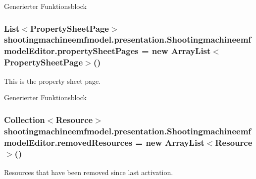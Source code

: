 Generierter Funktionsblock \hypertarget{classshootingmachineemfmodel_1_1presentation_1_1_shootingmachineemfmodel_editor_a582ed985bfbd7a5df3ff81eab6d30172}{
\subsubsection[{property\-Sheet\-Pages}]{\setlength{\rightskip}{0pt plus 5cm}List$<$Property\-Sheet\-Page$>$ shootingmachineemfmodel.\-presentation.\-Shootingmachineemfmodel\-Editor.\-property\-Sheet\-Pages = new Array\-List$<$Property\-Sheet\-Page$>$()\hspace{0.3cm}{\ttfamily [protected]}}}\label{classshootingmachineemfmodel_1_1presentation_1_1_shootingmachineemfmodel_editor_a582ed985bfbd7a5df3ff81eab6d30172}
This is the property sheet page.

Generierter Funktionsblock \hypertarget{classshootingmachineemfmodel_1_1presentation_1_1_shootingmachineemfmodel_editor_abbd471685319f6b671fc241681618bdc}{
\subsubsection[{removed\-Resources}]{\setlength{\rightskip}{0pt plus 5cm}Collection$<$Resource$>$ shootingmachineemfmodel.\-presentation.\-Shootingmachineemfmodel\-Editor.\-removed\-Resources = new Array\-List$<$Resource$>$()\hspace{0.3cm}{\ttfamily [protected]}}}\label{classshootingmachineemfmodel_1_1presentation_1_1_shootingmachineemfmodel_editor_abbd471685319f6b671fc241681618bdc}
Resources that have been removed since last activation.

